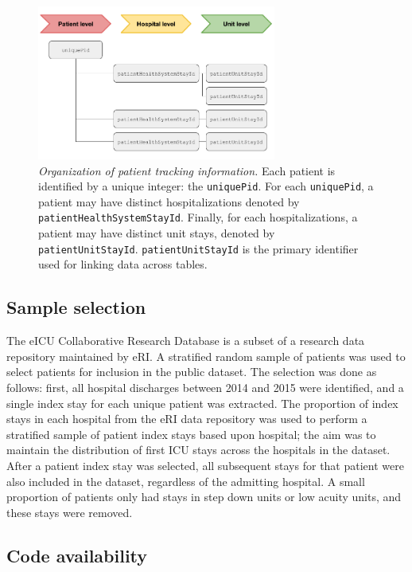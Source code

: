 \documentclass[english]{article}
\newcommand{\colname}[1]{\texttt{#1}}
\begin{document}
\begin{figure}[htbp]
\centering
\includegraphics[width=0.70000\textwidth]{img/Patient_Organization.png}
\caption{\emph{Organization of patient tracking information.} Each patient is identified by a unique integer: the \colname{uniquePid}. For each \colname{uniquePid}, a patient may have distinct hospitalizations denoted by \colname{patientHealthSystemStayId}. Finally, for each hospitalizations, a patient may have distinct unit stays, denoted by \colname{patientUnitStayId}. \colname{patientUnitStayId} is the primary identifier used for linking data across tables. \label{fig:patient_organization}}
\end{figure}


\subsection*{Sample selection}\label{sample-selection}

The eICU Collaborative Research Database is a subset of a research data repository maintained by eRI.
A stratified random sample of patients was used to select patients for
inclusion in the public dataset. The selection was done as follows: first, all
hospital discharges between 2014 and 2015 were identified, and a single
index stay for each unique patient was extracted. The proportion of
index stays in each hospital from the eRI data repository was used to
perform a stratified sample of patient index stays based upon hospital;
the aim was to maintain the distribution of first ICU stays across the
hospitals in the dataset. After a patient index stay was selected, all
subsequent stays for that patient were also included in the dataset,
regardless of the admitting hospital. A small proportion of patients
only had stays in step down units or low acuity units, and these stays
were removed.

\subsection*{Code availability}
\end{document}
